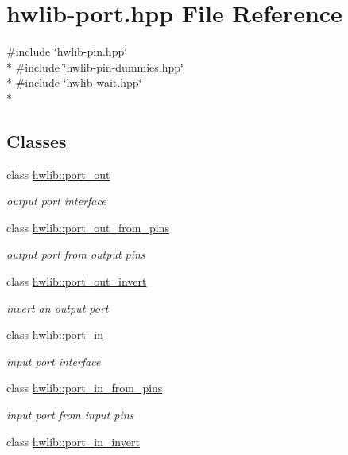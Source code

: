 \hypertarget{hwlib-port_8hpp}{}\section{hwlib-\/port.hpp File Reference}
\label{hwlib-port_8hpp}
{\ttfamily \#include \char`\"{}hwlib-\/pin.\+hpp\char`\"{}}\\*
{\ttfamily \#include \char`\"{}hwlib-\/pin-\/dummies.\+hpp\char`\"{}}\\*
{\ttfamily \#include \char`\"{}hwlib-\/wait.\+hpp\char`\"{}}\\*
\subsection*{Classes}
\begin{DoxyCompactItemize}
\item 
class \hyperlink{classhwlib_1_1port__out}{hwlib\+::port\+\_\+out}
\begin{DoxyCompactList}\small\item\em output port interface \end{DoxyCompactList}\item 
class \hyperlink{classhwlib_1_1port__out__from__pins}{hwlib\+::port\+\_\+out\+\_\+from\+\_\+pins}
\begin{DoxyCompactList}\small\item\em output port from output pins \end{DoxyCompactList}\item 
class \hyperlink{classhwlib_1_1port__out__invert}{hwlib\+::port\+\_\+out\+\_\+invert}
\begin{DoxyCompactList}\small\item\em invert an output port \end{DoxyCompactList}\item 
class \hyperlink{classhwlib_1_1port__in}{hwlib\+::port\+\_\+in}
\begin{DoxyCompactList}\small\item\em input port interface \end{DoxyCompactList}\item 
class \hyperlink{classhwlib_1_1port__in__from__pins}{hwlib\+::port\+\_\+in\+\_\+from\+\_\+pins}
\begin{DoxyCompactList}\small\item\em input port from input pins \end{DoxyCompactList}\item 
class \hyperlink{classhwlib_1_1port__in__invert}{hwlib\+::port\+\_\+in\+\_\+invert}

\end{DoxyCompactItemize}
